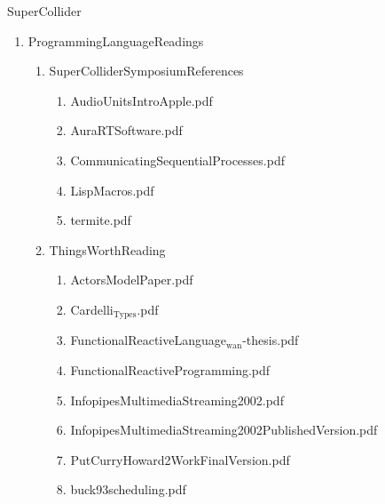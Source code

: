 \documentclass[11pt]{article}
\begin{document}
\item SuperCollider
\label{sec-1-1-1-1-38-9}
\begin{enumerate}
\item ProgrammingLanguageReadings
\label{sec-1-1-1-1-38-9-1}
\begin{enumerate}
\item SuperColliderSymposiumReferences
\label{sec-1-1-1-1-38-9-1-1}
\begin{enumerate}
\item AudioUnitsIntroApple.pdf
\label{sec-1-1-1-1-38-9-1-1-1}

\item AuraRTSoftware.pdf
\label{sec-1-1-1-1-38-9-1-1-2}

\item CommunicatingSequentialProcesses.pdf
\label{sec-1-1-1-1-38-9-1-1-3}

\item LispMacros.pdf
\label{sec-1-1-1-1-38-9-1-1-4}

\item termite.pdf
\label{sec-1-1-1-1-38-9-1-1-5}
\end{enumerate}

\item ThingsWorthReading
\label{sec-1-1-1-1-38-9-1-2}
\begin{enumerate}
\item ActorsModelPaper.pdf
\label{sec-1-1-1-1-38-9-1-2-1}

\item Cardelli$_{\text{Types}}$.pdf
\label{sec-1-1-1-1-38-9-1-2-2}

\item FunctionalReactiveLanguage$_{\text{wan}}$-thesis.pdf
\label{sec-1-1-1-1-38-9-1-2-3}

\item FunctionalReactiveProgramming.pdf
\label{sec-1-1-1-1-38-9-1-2-4}

\item InfopipesMultimediaStreaming2002.pdf
\label{sec-1-1-1-1-38-9-1-2-5}

\item InfopipesMultimediaStreaming2002PublishedVersion.pdf
\label{sec-1-1-1-1-38-9-1-2-6}

\item PutCurryHoward2WorkFinalVersion.pdf
\label{sec-1-1-1-1-38-9-1-2-7}

\item buck93scheduling.pdf
\label{sec-1-1-1-1-38-9-1-2-8}


\end{enumerate}
\end{enumerate}
\end{enumerate}
\end{document}
